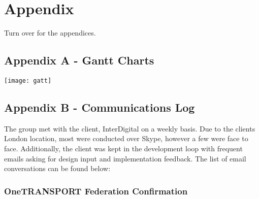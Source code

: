 \chapter{Appendix}

Turn over for the appendices.

\clearpage

\section{Appendix A - Gantt Charts}

\begin{center}
\texttt{[image: gatt]}
\end{center}

\section{Appendix B - Communications Log}

The group met with the client, InterDigital on a weekly basis. Due to the clients London location, most were conducted over Skype, however a few were face to face. Additionally, the client was kept in the development loop with frequent emails asking for design input and implementation feedback. The list of email conversations can be found below:

\subsection*{OneTRANSPORT Federation Confirmation}
\label{sec:fed-conf}


